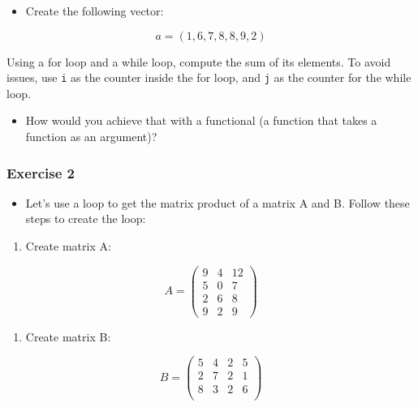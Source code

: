 \documentclass[
]{article}
\providecommand{\tightlist}{%
  \setlength{\itemsep}{0pt}\setlength{\parskip}{0pt}}
\begin{document}
\begin{itemize}
\tightlist
\item
  Create the following vector:
\end{itemize}

\[a = (1,6,7,8,8,9,2)\]

Using a for loop and a while loop, compute the sum of its elements. To avoid issues, use \texttt{i}
as the counter inside the for loop, and \texttt{j} as the counter for the while loop.

\begin{itemize}
\tightlist
\item
  How would you achieve that with a functional (a function that takes a function as an argument)?
\end{itemize}

\hypertarget{exercise-2-3}{%
\subsubsection*{Exercise 2}\label{exercise-2-3}}

\begin{itemize}
\tightlist
\item
  Let's use a loop to get the matrix product of a matrix A and B. Follow these steps to create the loop:
\end{itemize}

\begin{enumerate}
\def\labelenumi{\arabic{enumi})}
\tightlist
\item
  Create matrix A:
\end{enumerate}

\[A = \left(
  \begin{array}{ccc}
   9 & 4 & 12 \\
   5 & 0 & 7 \\
   2 & 6 & 8 \\
   9 & 2 & 9
  \end{array} \right)
\]

\begin{enumerate}
\def\labelenumi{\arabic{enumi})}
\setcounter{enumi}{1}
\tightlist
\item
  Create matrix B:
\end{enumerate}

\[B = \left(
\begin{array}{cccc}
 5 & 4 & 2 & 5 \\
 2 & 7 & 2 & 1 \\
 8 & 3 & 2 & 6 \\
\end{array} \right)
\]
\end{document}
